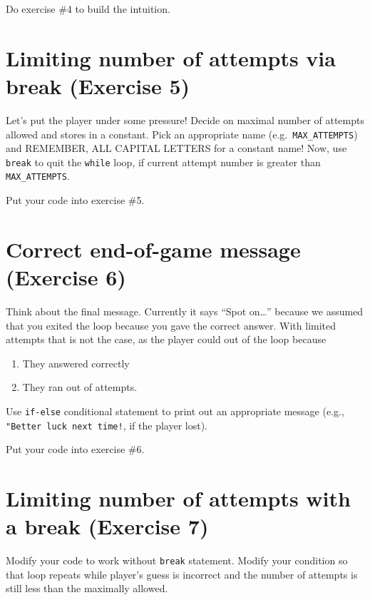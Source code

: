 \documentclass[
]{book}
\providecommand{\tightlist}{%
  \setlength{\itemsep}{0pt}\setlength{\parskip}{0pt}}
\begin{document}
Do exercise \#4 to build the intuition.

\hypertarget{limiting-number-of-attempts-via-break-exercise-5}{%
\section{Limiting number of attempts via break (Exercise 5)}\label{limiting-number-of-attempts-via-break-exercise-5}}

Let's put the player under some pressure! Decide on maximal number of attempts allowed and stores in a constant. Pick an appropriate name (e.g.~\texttt{MAX\_ATTEMPTS}) and REMEMBER, ALL CAPITAL LETTERS for a constant name! Now, use \texttt{break} to quit the \texttt{while} loop, if current attempt number is greater than \texttt{MAX\_ATTEMPTS}.

Put your code into exercise \#5.

\hypertarget{correct-end-of-game-message-exercise-6}{%
\section{Correct end-of-game message (Exercise 6)}\label{correct-end-of-game-message-exercise-6}}

Think about the final message. Currently it says ``Spot on\ldots{}'' because we assumed that you exited the loop because you gave the correct answer. With limited attempts that is not the case, as the player could out of the loop because

\begin{enumerate}
\def\labelenumi{\arabic{enumi}.}
\tightlist
\item
  They answered correctly
\item
  They ran out of attempts.
\end{enumerate}

Use \texttt{if-else} conditional statement to print out an appropriate message (e.g., \texttt{"Better\ luck\ next\ time!}, if the player lost).

Put your code into exercise \#6.

\hypertarget{limiting-number-of-attempts-with-a-break-exercise-7}{%
\section{Limiting number of attempts with a break (Exercise 7)}\label{limiting-number-of-attempts-with-a-break-exercise-7}}

Modify your code to work without \texttt{break} statement. Modify your condition so that loop repeats while player's guess is incorrect and the number of attempts is still less than the maximally allowed.
\end{document}
